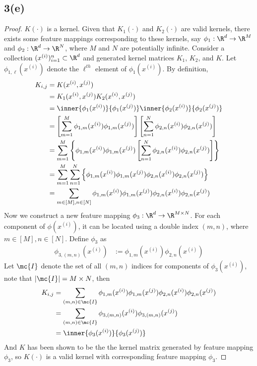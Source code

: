 \documentclass[11pt]{article}
\newcommand{\upi}[0]{^{(i)}}
\newcommand{\upj}[0]{^{(j)}}
\begin{document}
	\newpage
	\subsection{3(e)}
	\begin{proof}
		$K(\cdot)$ is a kernel. Given that $K_1(\cdot)$ and $K_2(\cdot)$ are valid kernels, there exists some feature mappings corresponding to these kernels, say $\phi_1: \R^d \to \R^M$ and $\phi_2: \R^d \to \R^N$, where $M$ and $N$ are potentially infinite. Consider a collection $(x\upi)_{i=1}^n \subset \R^d$ and generated kernel matrices $K_1$, $K_2$, and $K$. Let $\phi_{1, \ell}(x\upi)$ denote the $\ell^{th}$ element of $\phi_1(x\upi)$. By definition,
		\begin{align}
			K_{i, j} &= K(x\upi, x\upj) \\
			&= K_1(x\upi, x^{(j)}) K_2(x\upi, x\upj) \\
			&= \inner{\phi_1(x\upi)}{\phi_1(x\upj)} \inner{\phi_2(x\upi)}{\phi_2(x\upj)} \\
			&= \left [
			\sum_{m=1}^M \phi_{1,m} (x\upi) \phi_{1,m}(x\upj)
			\right] \left[
			\sum_{n=1}^N \phi_{2,n} (x\upi) \phi_{2,n}(x\upj)
			\right] \\
			&= \sum_{m=1}^M 
			\left \{ \phi_{1,m} (x\upi) \phi_{1,m}(x\upj)
			\left[
			\sum_{n=1}^N \phi_{2,n} (x\upi) \phi_{2,n}(x\upj)
			\right] \right\} \\
			&= \sum_{m=1}^M \sum_{n=1}^N \left \{
			\phi_{1,m} (x\upi) \phi_{1,m}(x\upj)
			\phi_{2,n} (x\upi) \phi_{2,n}(x\upj)
			\right \} \\
			&= \sum_{m \in [M], n \in [N]}
			\phi_{1,m} (x\upi) \phi_{1,m}(x\upj)
			\phi_{2,n} (x\upi) \phi_{2,n}(x\upj)
		\end{align}
		Now we construct a new feature mapping $\phi_3: \R^d \to \R^{M \times N}$. For each component of $\phi(x\upi)$, it can be located using a double index $(m, n)$, where $m \in [M], n \in [N]$. Define $\phi_3$ as 
		\begin{align}
			\phi_{3, (m, n)}(x\upi) &:= \phi_{1, m} (x\upi) \phi_{2, n}(x\upi)
		\end{align}
		Let $\mc{I}$ denote the set of all $(m, n)$ indices for components of $\phi_3(x\upi)$, note that $|\mc{I}| = M \times N$, then 
		\begin{align}
			K_{i, j} &= \sum_{(m, n) \in \mc{I}}
			\phi_{1,m} (x\upi) \phi_{1,m}(x\upj)
			\phi_{2,n} (x\upi) \phi_{2,n}(x\upj) \\
			&= \sum_{(m, n) \in \mc{I}} \phi_{3, (m, n)}(x\upi) \phi_{3, (m, n)}(x\upj) \\
			&= \inner{\phi_3(x\upi)}{\phi_3(x\upj)}
		\end{align}
		And $K$ has been shown to be the the kernel matrix generated by feature mapping $\phi_3$, so $K(\cdot)$ is a valid kernel with corresponding feature mapping $\phi_3$.
	\end{proof}
	
\end{document}
